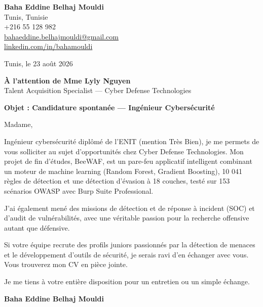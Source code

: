 \documentclass[a4paper,11pt]{article}
\begin{document}
\begin{flushright}
{\bfseries Baha Eddine Belhaj Mouldi}\\
Tunis, Tunisie\\
+216 55 128 982\\
\href{mailto:bahaeddine.belhajmouldi@gmail.com}{bahaeddine.belhajmouldi@gmail.com}\\
\href{https://linkedin.com/in/bahamouldi}{linkedin.com/in/bahamouldi}
\end{flushright}
\vspace{0.8cm}
\begin{flushleft}
Tunis, le 23 ao\^ut 2026
\vspace{0.8cm}

{\bfseries \`A l'attention de Mme Lyly Nguyen}\\
Talent Acquisition Specialist --- Cyber Defense Technologies
\vspace{0.6cm}

{\bfseries Objet : Candidature spontan\'ee --- Ing\'enieur Cybers\'ecurit\'e}
\end{flushleft}
\vspace{0.6cm}
Madame,

Ing\'enieur cybers\'ecurit\'e dipl\^om\'e de l'ENIT (mention Tr\`es Bien), je me permets de vous solliciter au sujet d'opportunit\'es chez Cyber Defense Technologies. Mon projet de fin d'\'etudes, BeeWAF, est un pare-feu applicatif intelligent combinant un moteur de machine learning (Random Forest, Gradient Boosting), 10 041 r\`egles de d\'etection et une d\'etection d'\'evasion \`a 18 couches, test\'e sur 153 sc\'enarios OWASP avec Burp Suite Professional.

J'ai \'egalement men\'e des missions de d\'etection et de r\'eponse \`a incident (SOC) et d'audit de vuln\'erabilit\'es, avec une v\'eritable passion pour la recherche offensive autant que d\'efensive.

Si votre \'equipe recrute des profils juniors passionn\'es par la d\'etection de menaces et le d\'eveloppement d'outils de s\'ecurit\'e, je serais ravi d'en \'echanger avec vous. Vous trouverez mon CV en pi\`ece jointe.

Je me tiens \`a votre enti\`ere disposition pour un entretien ou un simple \'echange.

\vspace{0.8cm}
\begin{flushright}
{\bfseries Baha Eddine Belhaj Mouldi}
\end{flushright}
\end{document}
